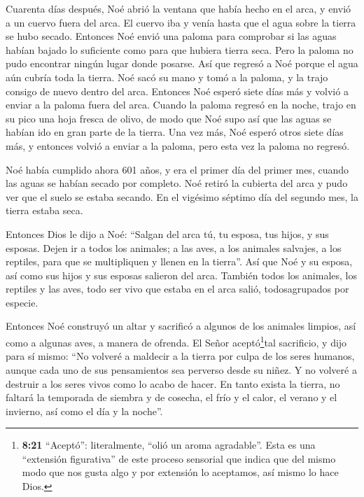  Cuarenta días después, Noé abrió la ventana que había hecho
en el arca,  y envió a un cuervo fuera del arca. El cuervo
iba y venía hasta que el agua sobre la tierra se hubo secado.
 Entonces Noé envió una paloma para comprobar si las aguas
habían bajado lo suficiente como para que hubiera tierra seca.
 Pero la paloma no pudo encontrar ningún lugar donde
posarse. Así que regresó a Noé porque el agua aún cubría toda la tierra.
Noé sacó su mano y tomó a la paloma, y la trajo consigo de nuevo dentro
del arca.  Entonces Noé esperó siete días más y volvió a
enviar a la paloma fuera del arca.  Cuando la paloma
regresó en la noche, trajo en su pico una hoja fresca de olivo, de modo
que Noé supo así que las aguas se habían ido en gran parte de la tierra.
 Una vez más, Noé esperó otros siete días más, y entonces
volvió a enviar a la paloma, pero esta vez la paloma no regresó.

 Noé había cumplido ahora 601 años, y era el primer día del
primer mes, cuando las aguas se habían secado por completo. Noé retiró
la cubierta del arca y pudo ver que el suelo se estaba secando.
 En el vigésimo séptimo día del segundo mes, la tierra
estaba seca.

 Entonces Dios le dijo a Noé:  ``Salgan del
arca tú, tu esposa, tus hijos, y sus esposas.  Dejen ir a
todos los animales; a las aves, a los animales salvajes, a los reptiles,
para que se multipliquen y llenen en la tierra''.  Así que
Noé y su esposa, así como sus hijos y sus esposas salieron del arca.
 También todos los animales, los reptiles y las aves, todo
ser vivo que estaba en el arca salió, todosagrupados por especie.

 Entonces Noé construyó un altar y sacrificó a algunos de
los animales limpios, así como a algunas aves, a manera de ofrenda.
 El Señor aceptó\footnote{\textbf{8:21} ``Aceptó'':
  literalmente, ``olió un aroma agradable''. Esta es una ``extensión
  figurativa'' de este proceso sensorial que indica que del mismo modo
  que nos gusta algo y por extensión lo aceptamos, así mismo lo hace
  Dios.}tal sacrificio, y dijo para sí mismo: ``No volveré a maldecir a
la tierra por culpa de los seres humanos, aunque cada uno de sus
pensamientos sea perverso desde su niñez. Y no volveré a destruir a los
seres vivos como lo acabo de hacer.  En tanto exista la
tierra, no faltará la temporada de siembra y de cosecha, el frío y el
calor, el verano y el invierno, así como el día y la noche''.

